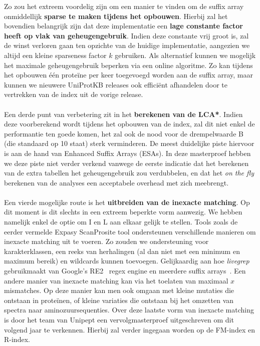 Zo zou het extreem voordelig zijn om een manier te vinden om de suffix array onmiddellijk \textbf{sparse te maken tijdens het opbouwen}.
Hierbij zal het bovendien belangrijk zijn dat deze implementatie een \textbf{lage constante factor heeft op vlak van geheugengebruik}.
Indien deze constante vrij groot is, zal de winst verloren gaan ten opzichte van de huidige implementatie, aangezien we altijd een kleine sparseness factor $k$ gebruiken.
Als alternatief kunnen we mogelijk het maximale geheugengebruik beperken via een online algoritme.
Zo kan tijdens het opbouwen één proteïne per keer toegevoegd worden aan de suffix array, maar kunnen we nieuwere UniProtKB releases ook efficiënt afhandelen door te vertrekken van de index uit de vorige release.
\\ \\
Een derde punt van verbetering zit in het \textbf{berekenen van de LCA*}.
Indien deze voorberekend wordt tijdens het opbouwen van de index, zal dit niet enkel de performantie ten goede komen, het zal ook de nood voor de drempelwaarde B (die standaard op 10 staat) sterk verminderen.
De meest duidelijke piste hiervoor is aan de hand van Enhanced Suffix Arrays (ESAs).
In deze masterproef hebben we deze piste niet verder verkend vanwege de eerste indicatie dat het berekenen van de extra tabellen het geheugengebruik zou verdubbelen, en dat het \textit{on the fly} berekenen van de analyses een acceptabele overhead met zich meebrengt.
\\ \\
Een vierde mogelijke route is het \textbf{uitbreiden van de inexacte matching}.
Op dit moment is dit slechts in een extreem beperkte vorm aanwezig.
We hebben namelijk enkel de optie om I en L aan elkaar gelijk te stellen.
Tools zoals de eerder vermelde Expasy ScanProsite tool ondersteunen verschillende manieren om inexacte matching uit te voeren.
Zo zouden we ondersteuning voor karakterklassen, een reeks van herhalingen (al dan niet met een minimum en maximum bereik) en wildcards kunnen toevoegen.
Gelijkaardig aan hoe \textit{livegrep}~\cite{livegrep} gebruikmaakt van Google's RE2~\cite{re2} regex engine en meerdere suffix arrays~\cite{regex_sa}.
Een andere manier van inexacte matching kan via het toelaten van maximaal $x$ mismatches.
Op deze manier kan men ook omgaan met kleine mutaties die ontstaan in proteïnen, of kleine variaties die ontstaan bij het omzetten van spectra naar aminozuursequenties.
Over deze laatste vorm van inexacte matching is door het team van Unipept een vervolgmasterproef uitgeschreven om dit volgend jaar te verkennen.
Hierbij zal verder ingegaan worden op de FM-index en R-index.
